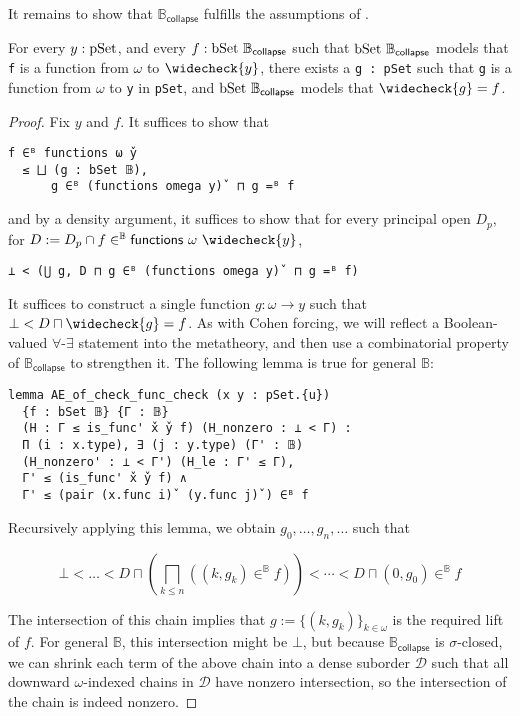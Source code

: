 \documentclass[sigplan,10pt,review, anonymous]{acmart}
\newcommand{\B}{\mathbb{B}}
\newcommand{\lil}{\lstinline}
\theoremstyle{definition}
\begin{document}
It remains to show that \(\mathbb{B}_{\mathsf{collapse}}\) fulfills the assumptions of .

\begin{lemma}\label{lemma:function-reflect}
  For every \(y : \text{\lil{pSet}}\), and every \(f : \text{\lil{bSet}}\ \mathbb{B}_{\mathsf{collapse}}\) such that \(\text{\lil{bSet}}\ \mathbb{B}_{\mathsf{collapse}}\) models that \lil{f} is a function from \(\omega\) to \(\widecheck{y}\),
  there exists a \lil{g : pSet} such that \lil{g} is a function from \(\omega\) to \lil{y} in \lil{pSet}, and \(\text{\lil{bSet}}\ \mathbb{B}_{\mathsf{collapse}}\) models that \(\widecheck{g} = f\).
\end{lemma}


\begin{proof}
  Fix \(y\) and \(f\). It suffices to show that
\begin{lstlisting}
f ∈ᴮ functions ω y̌
  ≤ ⨆ (g : bSet 𝔹),
      g ∈ᴮ (functions omega y)̌  ⊓ g =ᴮ f
\end{lstlisting}
  and by a density argument, it suffices to show that for every principal open \(D_p\), for \(D := D_p \cap f \in^{\B} \mathsf{functions}\ \omega \ \widecheck{y}\),
\begin{lstlisting}
⊥ < (⋃ g, D ⊓ g ∈ᴮ (functions omega y)̌  ⊓ g =ᴮ f)
\end{lstlisting}
  It suffices to construct a single function \(g : \omega \to y\) such that \(\bot < D \sqcap \widecheck{g} = f\).
  As with Cohen forcing, we will reflect a Boolean-valued \(\forall\)-\(\exists\) statement into the metatheory, and then use a combinatorial property of \(\mathbb{B}_{\mathsf{collapse}}\) to strengthen it.
  The following lemma is true for general \(\mathbb{B}\):
\begin{lstlisting}
lemma AE_of_check_func_check (x y : pSet.{u})
  {f : bSet 𝔹} {Γ : 𝔹}
  (H : Γ ≤ is_func' x̌ y̌ f) (H_nonzero : ⊥ < Γ) :
  Π (i : x.type), ∃ (j : y.type) (Γ' : 𝔹)
  (H_nonzero' : ⊥ < Γ') (H_le : Γ' ≤ Γ),
  Γ' ≤ (is_func' x̌ y̌ f) ∧
  Γ' ≤ (pair (x.func i)̌  (y.func j)̌ ) ∈ᴮ f
\end{lstlisting}
Recursively applying this lemma, we obtain \(g_0, \dots, g_n, \dots\) such that

\[\bot < \dots < D \sqcap \left(\bigsqcap_{k \leq n} ((k, g_k) \in^{\mathbb{B}} f)\right) < \cdots < D \sqcap (0 , g_0) \in^{\mathbb{B}} f\]

The intersection of this chain implies that \(g := \{(k, g_k)\}_{k \in \omega}\) is the required lift of \(f\). For general \(\mathbb{B}\), this intersection might be \(\bot\), but because \(\mathbb{B}_{\mathsf{collapse}}\) is \(\sigma\)-closed, we can shrink each term of the above chain into a dense suborder \(\mathcal{D}\) such that all downward \(\omega\)-indexed chains in \(\mathcal{D}\) have nonzero intersection, so the intersection of the chain is indeed nonzero.
\end{proof}
\end{document}
